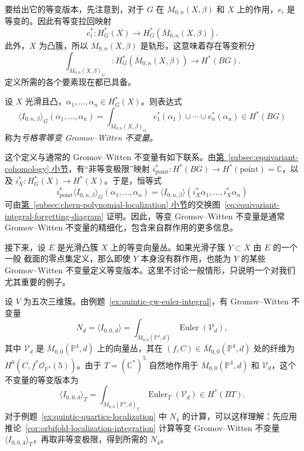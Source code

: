 要给出它的等变版本，先注意到，对于 $G$ 在 $\overline M_{0,n}(X,\beta)$ 和 $X$ 上的作用，$e_i$ 是等变的。因此有等变拉回映射
\[
e_i^*:H_G^*(X)\longrightarrow H_G^*(\overline M_{0,n}(X,\beta)).
\]
此外，$X$ 为凸簇，所以 $\overline M_{0,n}(X,\beta)$ 是轨形，这意味着存在等变积分
\[
\int_{\overline M_{0,n}(X,\beta)_G}:
H_G^*(\overline M_{0,n}(X,\beta))\longrightarrow H^*(BG).
\]
定义所需的各个要素现在都已具备。
\begin{definition}\label{def:equivariant-gw}
设 $X$ 光滑且凸，$\alpha_1,\ldots,\alpha_n\in H_G^*(X)$。则表达式
\[
\langle I_{0,n,\beta}\rangle_G(\alpha_1,\ldots,\alpha_n)
=\int_{\overline M_{0,n}(X,\beta)_G}e_1^*(\alpha_1)\cup\cdots\cup e_n^*(\alpha_n)
\in H^*(BG)
\]
称为\emph{亏格零等变 Gromov--Witten 不变量}。
\end{definition}

这个定义与通常的 Gromov--Witten 不变量有如下联系。由\hyperref[subsec:equivariant-cohomology]{第~\ref*{subsec:equivariant-cohomology} 小节}，有“非等变极限”映射 $i_{\mathrm{point}}^*:H^*(BG)\to H^*(\mathrm{point})=\mathbb C$，以及 $i_X^*:H_G^*(X)\to H^*(X)$。于是，恒等式
\[
i_{\mathrm{point}}^*\langle I_{0,n,\beta}\rangle_G(\alpha_1,\ldots,\alpha_n)
=\langle I_{0,n,\beta}\rangle(i_X^*\alpha_1,\ldots,i_X^*\alpha_n)
\]
可由\hyperref[subsec:chern-polynomial-localization]{第~\ref*{subsec:chern-polynomial-localization} 小节}的交换图~\eqref{eq:equivariant-integral-forgetting-diagram} 证明。因此，等变 Gromov--Witten 不变量是通常 Gromov--Witten 不变量的精细化，包含来自群作用的更多信息。

接下来，设 $E$ 是光滑凸簇 $X$ 上的等变向量丛。如果光滑子簇 $Y\subset X$ 由 $E$ 的一个一般
截面的零点集定义，那么即使 $Y$ 本身没有群作用，也能为 $Y$ 的某些 Gromov--Witten 不变量定义等变版本。这里不讨论一般情形，只说明一个对我们尤其重要的例子。
\begin{example}\label{ex:equivariant-quintic-gw}
设 $V$ 为五次三维簇。由例题~\ref{ex:quintic-gw-euler-integral}，有 Gromov--Witten 不变量
\[
N_d=\langle I_{0,0,d}\rangle
=\int_{\overline M_{0,0}(\mathbb P^4,d)}\operatorname{Euler}(\mathcal V_d),
\]
其中 $\mathcal V_d$ 是 $\overline M_{0,0}(\mathbb P^4,d)$ 上的向量丛，其在 $(f,C)\in\overline M_{0,0}(\mathbb P^4,d)$ 处的纤维为 $H^0(C,f^*\mathcal O_{\mathbb P^4}(5))$。由于 $T=(\mathbb C^*)^5$ 自然地作用于 $\overline M_{0,0}(\mathbb P^4,d)$ 和 $\mathcal V_d$，这个不变量的等变版本为
\[
\langle I_{0,0,d}\rangle_T
=\int_{\overline M_{0,0}(\mathbb P^4,d)_T}\operatorname{Euler}_T(\mathcal V_d)
\in H^*(BT).
\]
对于例题~\ref{ex:quintic-quartics-localization} 中 $N_4$ 的计算，可以这样理解：先应用推论~\ref{cor:orbifold-localization-integration} 计算等变 Gromov--Witten 不变量 $\langle I_{0,0,4}\rangle_T$，再取非等变极限，得到所需的 $N_4$。
\end{example}

